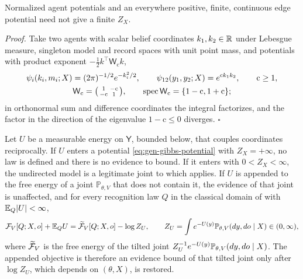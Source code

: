Normalized agent potentials and an everywhere positive, finite, continuous edge potential need not give a
finite $Z_X$. 

\noindent\emph{Proof.}
Take two agents with scalar belief coordinates $k_1,k_2\in\mathbb R$ under Lebesgue measure, singleton model and
record spaces with unit point mass, and potentials with product exponent
$-\tfrac12k^\top\mathsf W_{\mathrm c}k$,
\begin{gather}
\psi_i(k_i,m_i;X)=(2\pi)^{-1/2}e^{-k_i^2/2},
\qquad
\psi_{12}(y_1,y_2;X)=e^{\mathrm ck_1k_2},
\qquad \mathrm c\geq1,
\label{eq:gen-gibbs-counterexample}\\
\mathsf W_{\mathrm c}=\begin{psmallmatrix}1&-\mathrm c\\-\mathrm c&1\end{psmallmatrix},
\qquad
\operatorname{spec}\mathsf W_{\mathrm c}=\{1-\mathrm c,1+\mathrm c\};
\label{eq:gen-gibbs-counterexample-matrix}
\end{gather}
in orthonormal sum and difference coordinates the integral factorizes, and the factor in the direction of
the eigenvalue $1-\mathrm c\leq0$ diverges. \hfill$\square$

Let $U$ be a measurable energy on $\mathsf Y$, bounded below, that couples coordinates reciprocally. If $U$
enters a potential \eqref{eq:gen-gibbs-potential} with $Z_X=+\infty$, no law is defined and there is no
evidence to bound. If it enters with $0<Z_X<\infty$, the undirected model is a legitimate joint to which
 applies. If $U$ is appended to the free energy of a joint $\mathbb P_{\theta,V}$ that does not
contain it, the evidence of that joint is unaffected, and for every recognition law $Q$ in the classical
domain of  with $\mathbb E_Q\lvert U\rvert<\infty$,
\begin{equation}
\mathcal F_V[Q;X,o]+\mathbb E_QU=\widetilde{\mathcal F}_V[Q;X,o]-\log Z_U,
\qquad
Z_U=\int e^{-U(y)}\mathbb P_{\theta,V}(dy,do\mid X)\in(0,\infty),
\label{eq:gen-appended-energy}
\end{equation}
where $\widetilde{\mathcal F}_V$ is the free energy of the tilted joint
$Z_U^{-1}e^{-U(y)}\mathbb P_{\theta,V}(dy,do\mid X)$. The appended objective is therefore an evidence bound of
that tilted joint only after $\log Z_U$, which depends on $(\theta,X)$, is restored. 

